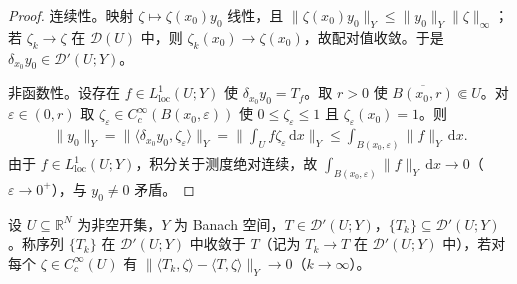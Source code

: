 \documentclass[../../main.tex]{subfiles}%
\begin{document}
\begin{proof}
连续性。映射 $\zeta\mapsto\zeta(x_0)y_0$ 线性，且 $\|\zeta(x_0)y_0\|_Y\leqslant\|y_0\|_Y\|\zeta\|_\infty$；若 $\zeta_k\to\zeta$ 在 $\mathcal{D}(U)$ 中，则 $\zeta_k(x_0)\to\zeta(x_0)$，故配对值收敛。于是 $\delta_{x_0}y_0\in\mathcal{D}'(U;Y)$。

非函数性。设存在 $f\in L^1_{\mathrm{loc}}(U;Y)$ 使 $\delta_{x_0}y_0=T_f$。取 $r>0$ 使 $\overline{B(x_0,r)}\Subset U$。对 $\varepsilon\in(0,r)$ 取 $\zeta_\varepsilon\in C_c^\infty(B(x_0,\varepsilon))$ 使 $0\leqslant\zeta_\varepsilon\leqslant1$ 且 $\zeta_\varepsilon(x_0)=1$。则
\begin{align*}
\|y_0\|_Y=\|\langle\delta_{x_0}y_0,\zeta_\varepsilon\rangle\|_Y=\Big\|\int_Uf\zeta_\varepsilon\,\mathrm{d}x\Big\|_Y\leqslant\int_{B(x_0,\varepsilon)}\|f\|_Y\,\mathrm{d}x .
\end{align*}
由于 $f\in L^1_{\mathrm{loc}}(U;Y)$，积分关于测度绝对连续，故 $\int_{B(x_0,\varepsilon)}\|f\|_Y\,\mathrm{d}x\to0$（$\varepsilon\to0^+$），与 $y_0\neq0$ 矛盾。
\end{proof}

\begin{definition}[分布收敛]\label{definition:ch04-分布收敛}
设 $U\subseteq\mathbb{R}^N$ 为非空开集，$Y$ 为 Banach 空间，$T\in\mathcal{D}'(U;Y)$，$\{T_k\}\subseteq\mathcal{D}'(U;Y)$。称序列 $\{T_k\}$ 在 $\mathcal{D}'(U;Y)$ 中收敛于 $T$（记为 $T_k\to T$ 在 $\mathcal{D}'(U;Y)$ 中），若对每个 $\zeta\in C_c^\infty(U)$ 有 $\|\langle T_k,\zeta\rangle-\langle T,\zeta\rangle\|_Y\to0$（$k\to\infty$）。
\end{definition}
\end{document}
